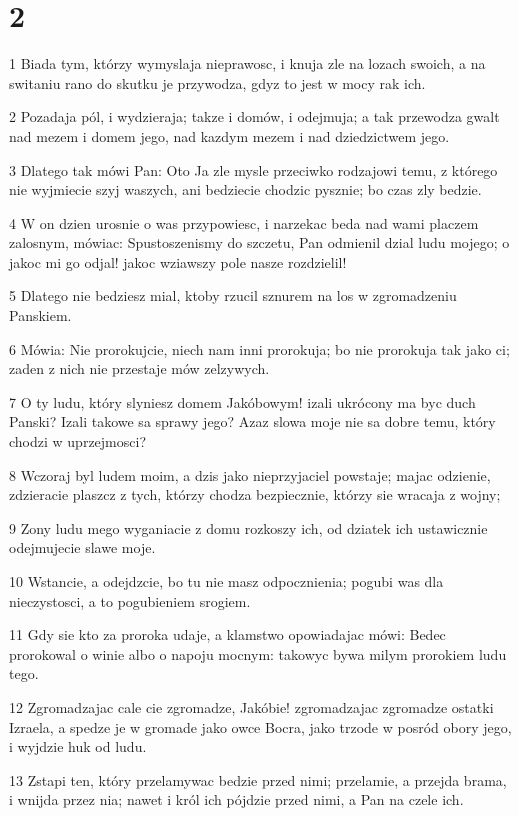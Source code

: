 \chapter{2}

\par 1 Biada tym, którzy wymyslaja nieprawosc, i knuja zle na lozach swoich, a na switaniu rano do skutku je przywodza, gdyz to jest w mocy rak ich.
\par 2 Pozadaja pól, i wydzieraja; takze i domów, i odejmuja; a tak przewodza gwalt nad mezem i domem jego, nad kazdym mezem i nad dziedzictwem jego.
\par 3 Dlatego tak mówi Pan: Oto Ja zle mysle przeciwko rodzajowi temu, z którego nie wyjmiecie szyj waszych, ani bedziecie chodzic pysznie; bo czas zly bedzie.
\par 4 W on dzien urosnie o was przypowiesc, i narzekac beda nad wami placzem zalosnym, mówiac: Spustoszenismy do szczetu, Pan odmienil dzial ludu mojego; o jakoc mi go odjal! jakoc wziawszy pole nasze rozdzielil!
\par 5 Dlatego nie bedziesz mial, ktoby rzucil sznurem na los w zgromadzeniu Panskiem.
\par 6 Mówia: Nie prorokujcie, niech nam inni prorokuja; bo nie prorokuja tak jako ci; zaden z nich nie przestaje mów zelzywych.
\par 7 O ty ludu, który slyniesz domem Jakóbowym! izali ukrócony ma byc duch Panski? Izali takowe sa sprawy jego? Azaz slowa moje nie sa dobre temu, który chodzi w uprzejmosci?
\par 8 Wczoraj byl ludem moim, a dzis jako nieprzyjaciel powstaje; majac odzienie, zdzieracie plaszcz z tych, którzy chodza bezpiecznie, którzy sie wracaja z wojny;
\par 9 Zony ludu mego wyganiacie z domu rozkoszy ich, od dziatek ich ustawicznie odejmujecie slawe moje.
\par 10 Wstancie, a odejdzcie, bo tu nie masz odpocznienia; pogubi was dla nieczystosci, a to pogubieniem srogiem.
\par 11 Gdy sie kto za proroka udaje, a klamstwo opowiadajac mówi: Bedec prorokowal o winie albo o napoju mocnym: takowyc bywa milym prorokiem ludu tego.
\par 12 Zgromadzajac cale cie zgromadze, Jakóbie! zgromadzajac zgromadze ostatki Izraela, a spedze je w gromade jako owce Bocra, jako trzode w posród obory jego, i wyjdzie huk od ludu.
\par 13 Zstapi ten, który przelamywac bedzie przed nimi; przelamie, a przejda brama, i wnijda przez nia; nawet i król ich pójdzie przed nimi, a Pan na czele ich.

